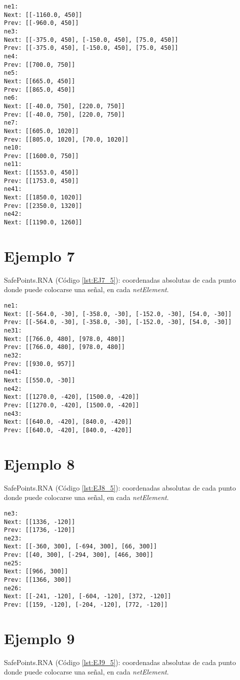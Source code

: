 	\begin{lstlisting}[language = {}, caption = SafePoints.RNA, label = {lst:EJ6_5}]
ne1:
Next: [[-1160.0, 450]]
Prev: [[-960.0, 450]]
ne3:
Next: [[-375.0, 450], [-150.0, 450], [75.0, 450]]
Prev: [[-375.0, 450], [-150.0, 450], [75.0, 450]]
ne4:
Prev: [[700.0, 750]]
ne5:
Next: [[665.0, 450]]
Prev: [[865.0, 450]]
ne6:
Next: [[-40.0, 750], [220.0, 750]]
Prev: [[-40.0, 750], [220.0, 750]]
ne7:
Next: [[605.0, 1020]]
Prev: [[805.0, 1020], [70.0, 1020]]
ne10:
Prev: [[1600.0, 750]]
ne11:
Next: [[1553.0, 450]]
Prev: [[1753.0, 450]]
ne41:
Next: [[1850.0, 1020]]
Prev: [[2350.0, 1320]]
ne42:
Next: [[1190.0, 1260]]
	\end{lstlisting}	
	\section{Ejemplo 7}
	SafePoints.RNA (Código \ref{lst:EJ7_5}): coordenadas absolutas de cada punto donde puede colocarse una señal, en cada \textit{netElement}.
	
	\begin{lstlisting}[language = {}, caption = SafePoints.RNA, label = {lst:EJ7_5}]
ne1:
Next: [[-564.0, -30], [-358.0, -30], [-152.0, -30], [54.0, -30]]
Prev: [[-564.0, -30], [-358.0, -30], [-152.0, -30], [54.0, -30]]
ne31:
Next: [[766.0, 480], [978.0, 480]]
Prev: [[766.0, 480], [978.0, 480]]
ne32:
Prev: [[930.0, 957]]
ne41:
Next: [[550.0, -30]]
ne42:
Next: [[1270.0, -420], [1500.0, -420]]
Prev: [[1270.0, -420], [1500.0, -420]]
ne43:
Next: [[640.0, -420], [840.0, -420]]
Prev: [[640.0, -420], [840.0, -420]]
	\end{lstlisting}	
	\section{Ejemplo 8}
	SafePoints.RNA (Código \ref{lst:EJ8_5}): coordenadas absolutas de cada punto donde puede colocarse una señal, en cada \textit{netElement}.
	
	\begin{lstlisting}[language = {}, caption = SafePoints.RNA, label = {lst:EJ8_5}]
ne3:
Next: [[1336, -120]]
Prev: [[1736, -120]]
ne23:
Next: [[-360, 300], [-694, 300], [66, 300]]
Prev: [[40, 300], [-294, 300], [466, 300]]
ne25:
Next: [[966, 300]]
Prev: [[1366, 300]]
ne26:
Next: [[-241, -120], [-604, -120], [372, -120]]
Prev: [[159, -120], [-204, -120], [772, -120]]
	\end{lstlisting}	
	\section{Ejemplo 9}
	SafePoints.RNA (Código \ref{lst:EJ9_5}): coordenadas absolutas de cada punto donde puede colocarse una señal, en cada \textit{netElement}.
	
